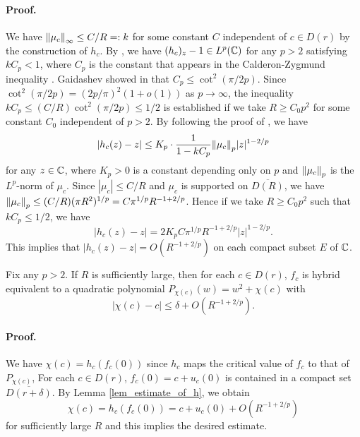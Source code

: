 \paragraph{\bf Proof.}
We have 
${\left\| \mu_c \right\|}_\infty \le C/R=:k$ for 
some constant $C$ independent of $c \in D(r)$
by the construction of $h_c$.
By \cite[Theorem 4.24]{IT Book}, 
we have $(h_c)_z-1 \in L^p(\mathbb C)$ for any $p>2$ satisfying $k C_p<1$, 
where $C_p$ is the constant that appears in the Calderon-Zygmund inequality
\cite[Proposition 4.22]{IT Book}.
Gaidashev showed in \cite[Lemma 6]{Gaidashev 2007} that $C_p \le \cot^2(\pi/2p)$.
Since $\cot^2(\pi/2p) = (2p/\pi)^2(1+o(1))$ as $p \to \infty$,
the inequality $k C_p \le (C/R) \cot^2(\pi/2p) \le 1/2$ 
is established if we take $R \ge C_0 p^2$ 
for some constant $C_0$ independent of $p>2$. 
By following the proof of \cite[\S 4, Corollary 2]{IT Book}, 
we have 
$$
|h_c(z)-z|
\le 
K_p \cdot \frac{1}{1-kC_p}{\left\| \mu_c \right\|}_p|z|^{1-2/p}  
$$
for any $z \in \mathbb C$, 
where $K_p>0$ is a constant depending only on $p$
and ${\left\| \mu_c \right\|}_p$ is the $L^p$-norm of $\mu_c$.
Since $|\mu_c|\le C/R$ and $\mu_c$ is supported on $\overline{D(R)}$,
we have ${\left\| \mu_c \right\|}_p \le (C/R)(\pi R^2)^{1/p} =C \pi^{1/p} R^{-1+2/p}$.
Hence if we take $R \ge C_0 p^2$ such that $kC_p \le 1/2$,
we have 
$$
|h_c(z)-z|= 2 K_p C \pi^{1/p} R^{-1+2/p} |z|^{1-2/p}.
$$
This implies that $|h_c(z)-z| =O( R^{-1+2/p})$
on each compact subset $E$ of $\mathbb C$. 
\QED 

\begin{cor}\label{cor_estimate_of_chi}
Fix any $p >2$. 
If $R$ is sufficiently large,
then for each $c \in D(r)$, 
$f_c$ is hybrid equivalent to 
a quadratic polynomial $P_{\chi(c)}(w)=w^2+\chi(c)$ 
with 
$$
|\chi(c)-c| \le \delta+O(R^{-1+2/p}).
$$
\end{cor}

\paragraph{\bf Proof.}
We have $\chi(c)=h_c(f_c(0))$ 
since $h_c$ maps the critical value of $f_c$ 
to that of $P_{\chi(c)}$, 
For each $c \in D(r)$,
$f_c(0) = c+u_c(0)$ is contained in a compact set $\overline{D(r+\delta)}$.
By Lemma \ref{lem_estimate_of_h}, we obtain
$$
\chi(c)=h_c(f_c(0))=c+u_c(0) + O(R^{-1+2/p})
$$
for sufficiently large $R$ and this implies the desired estimate.
\QED 

\medskip

